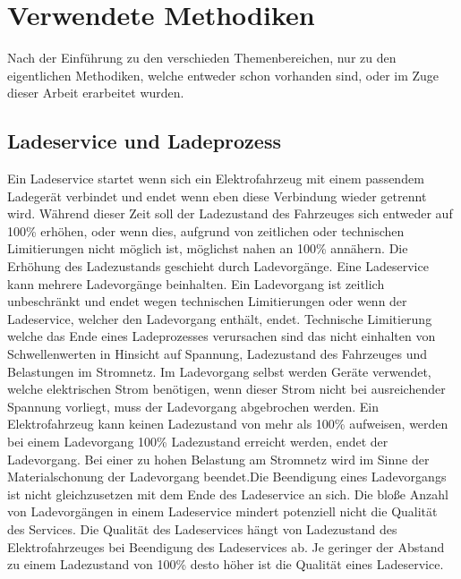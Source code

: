 \chapter{Verwendete Methodiken}
Nach der Einführung zu den verschieden Themenbereichen, nur zu den eigentlichen Methodiken, welche entweder schon vorhanden sind, oder im Zuge dieser Arbeit erarbeitet wurden.
\section{Ladeservice und Ladeprozess}
Ein Ladeservice startet wenn sich ein Elektrofahrzeug mit einem passendem Ladegerät verbindet und endet wenn eben diese Verbindung wieder getrennt wird. Während dieser Zeit soll der Ladezustand des Fahrzeuges sich entweder auf 100\% erhöhen, oder wenn dies, aufgrund von zeitlichen oder technischen Limitierungen nicht möglich ist, möglichst nahen an 100\% annähern. Die Erhöhung des Ladezustands geschieht durch Ladevorgänge. Eine Ladeservice kann mehrere Ladevorgänge beinhalten. Ein Ladevorgang ist zeitlich unbeschränkt und endet wegen technischen Limitierungen oder wenn der Ladeservice, welcher den Ladevorgang enthält, endet. Technische Limitierung welche das Ende eines Ladeprozesses verursachen sind das nicht einhalten von Schwellenwerten in Hinsicht auf Spannung, Ladezustand des Fahrzeuges und Belastungen im Stromnetz. Im Ladevorgang selbst werden Geräte verwendet, welche elektrischen Strom benötigen, wenn dieser Strom nicht bei ausreichender Spannung vorliegt, muss der Ladevorgang abgebrochen werden. Ein Elektrofahrzeug kann keinen Ladezustand von mehr als 100\% aufweisen, werden bei einem Ladevorgang 100\% Ladezustand erreicht werden, endet der Ladevorgang. Bei einer zu hohen Belastung am Stromnetz wird im Sinne der Materialschonung der Ladevorgang beendet.Die Beendigung eines Ladevorgangs ist nicht gleichzusetzen mit dem Ende des Ladeservice an sich. Die bloße Anzahl von Ladevorgängen in einem Ladeservice mindert potenziell nicht die Qualität des Services. Die Qualität des Ladeservices hängt von Ladezustand des Elektrofahrzeuges bei Beendigung des Ladeservices ab. Je geringer der Abstand zu einem Ladezustand von 100\% desto höher ist die Qualität eines Ladeservice.
